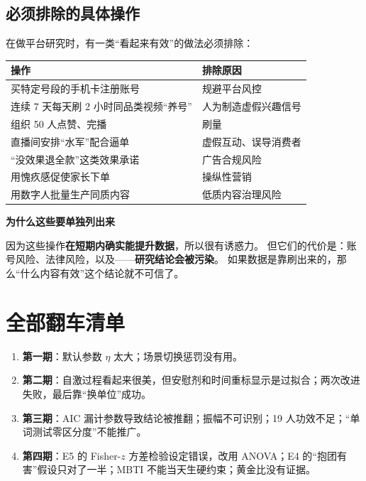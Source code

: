 \documentclass[UTF8,a4paper,11pt]{ctexart}
\newenvironment{explainbox}[1]
{\begin{center}\begin{minipage}{0.94\textwidth}\colorbox{boxbg}{\parbox{0.92\textwidth}{\textbf{#1}\par\vspace{2pt}}}}
{\end{minipage}\end{center}}
\newcommand{\hl}[1]{\textcolor{blue!70!black}{\textbf{#1}}}
\begin{document}
\subsection{必须排除的具体操作}

在做平台研究时，有一类“看起来有效”的做法必须排除：

\begin{longtable}{@{}p{7.0cm}p{6.6cm}@{}}
\toprule
\textbf{操作} & \textbf{排除原因} \\
\midrule
买特定号段的手机卡注册账号 & 规避平台风控 \\
连续 7 天每天刷 2 小时同品类视频“养号” & 人为制造虚假兴趣信号 \\
组织 50 人点赞、完播 & 刷量 \\
直播间安排“水军”配合逼单 & 虚假互动、误导消费者 \\
“没效果退全款”这类效果承诺 & 广告合规风险 \\
用愧疚感促使家长下单 & 操纵性营销 \\
用数字人批量生产同质内容 & 低质内容治理风险 \\
\bottomrule
\end{longtable}

\begin{explainbox}{为什么这些要单独列出来}
因为这些操作\textbf{在短期内确实能提升数据}，所以很有诱惑力。
但它们的代价是：账号风险、法律风险，以及——\hl{研究结论会被污染}。
如果数据是靠刷出来的，那么“什么内容有效”这个结论就不可信了。
\end{explainbox}

\newpage


\section{全部翻车清单}

\begin{enumerate}[leftmargin=2em]
\item \textbf{第一期}：默认参数 $\eta$ 太大；场景切换惩罚没有用。
\item \textbf{第二期}：自激过程看起来很美，但安慰剂和时间重标显示是过拟合；两次改进失败，最后靠“换单位”成功。
\item \textbf{第三期}：AIC 漏计参数导致结论被推翻；振幅不可识别；19 人功效不足；“单词测试零区分度”不能推广。
\item \textbf{第四期}：E5 的 Fisher-$z$ 方差检验设定错误，改用 ANOVA；E4 的“抱团有害”假设只对了一半；MBTI 不能当天生硬约束；黄金比没有证据。
\end{enumerate}
\end{document}

